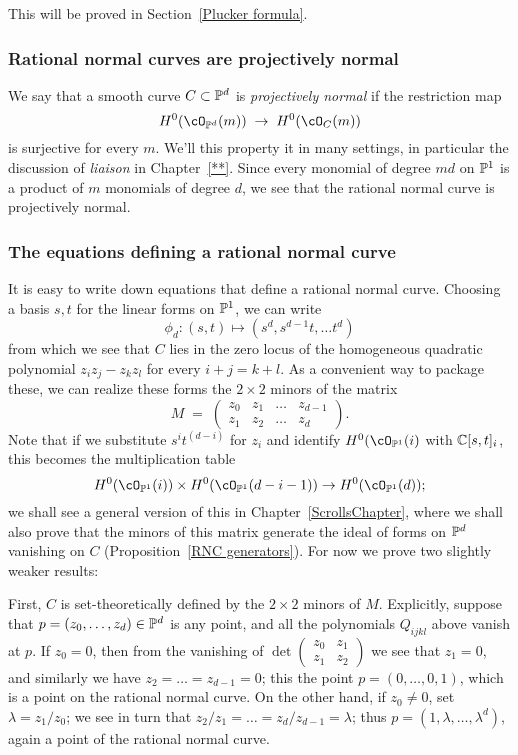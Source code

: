 This will be proved in Section~\ref{Plucker formula}.

\subsubsection{Rational normal curves are projectively normal}


We say that a smooth curve $C \subset \PP^d$ is \emph{projectively normal} if the restriction map
$$
H^0(\cO_{\PP^d}(m)) \; \to \; H^0(\cO_{C}(m)) 
$$
is surjective for every $m$. We'll this property it in many settings, in particular the discussion of \emph{liaison} in Chapter~\ref{**}.
Since every monomial of degree $md$ on $\PP^1$ is a product of $m$ monomials of degree $d$, we see that the rational normal curve is projectively normal. 


\subsubsection{The equations defining a rational normal curve}
It is easy to write down equations that define a rational normal curve. Choosing a basis $s,t$ for the linear forms on $\PP^1$, we can write
$$
\phi_d : (s,t) \mapsto (s^d, s^{d-1}t,\dots t^d)
$$
from which we see that $C$ lies in the zero locus of the homogeneous quadratic polynomial $z_iz_j - z_kz_l$ for every $i+j=k+l$. As a convenient way to package these, we can realize these forms the $2\times 2$ minors of the matrix
$$
M \; = \; \begin{pmatrix}
z_0 & z_1 & \dots & z_{d-1} \\
z_1 & z_2 & \dots & z_d
\end{pmatrix}.
$$
Note that if we substitute $s^it^{(d-i)}$ for $z_i$ and identify $H^0(\cO_{\PP^1}(i)$ with $\CC[s,t]_i$, this becomes the multiplication table
$$
H^0(\cO_{\PP^1}(i)) \times H^0(\cO_{\PP^1}(d-i-1)) \to H^0(\cO_{\PP^1}(d));
$$
we shall see a general version of this in Chapter~\ref{ScrollsChapter}, where we shall also prove that 
the minors of this matrix generate the ideal of forms on $\PP^d$ vanishing on $C$ (Proposition~\ref{RNC generators}).
For now we prove two slightly weaker results:

First, $C$ is set-theoretically defined by the $2\times 2$ minors of $M$. Explicitly, suppose that $p = (z_0,\dots,z_d) \in \PP^d$ is any point, and all the polynomials $Q_{ijkl}$ above vanish at $p$. If $z_0 = 0$, then from the vanishing of 
$\det \begin{pmatrix}
z_0 & z_1  \\
z_1 & z_2 
\end{pmatrix}$ 
we see that $z_1 = 0$, and similarly we have $z_2 = \dots = z_{d-1}=0$; this the point $p = (0,\dots,0,1)$, which is a point on the rational normal curve. On the other hand, if $z_0 \neq 0$, set $\lambda = z_1/z_0$; we see in turn that $z_2/z_1 = \dots = z_d/z_{d-1} = \lambda$; thus $p = (1, \lambda, \dots,\lambda^d)$, again a point of the rational normal curve.

